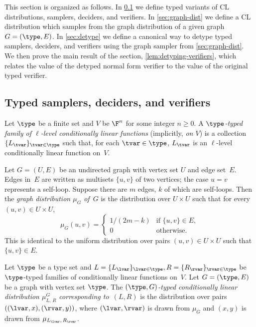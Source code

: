 This section is organized as follows.
In \cref{sec:typed-samplers} we define typed variants of CL distributions,
samplers, deciders, and verifiers.
In \cref{sec:graph-dist} we define a CL distribution which samples from the
graph distribution of a given graph $G = (\type, E)$.
In \cref{sec:detype} we define a canonical way to detype typed samplers,
deciders, and verifiers using the graph sampler from \cref{sec:graph-dist}.
We then prove the main result of the section, \cref{lem:detyping-verifiers},
which relates the value of the detyped normal form verifier to the value of
the original typed verifier.

\subsection{Typed samplers, deciders, and verifiers}
\label{sec:typed-samplers}

\begin{definition}
  Let $\type$ be a finite set and $V$ be $\F^n$ for some integer $n \geq 0$.
  A \emph{$\type$-typed family of $\ell$-level conditionally linear functions}
  (implicitly, \emph{on $V$}) is a collection $\{L_\tvar\}_{\tvar \in \type}$
  such that, for each $\tvar \in \type$, $L_\tvar$ is an $\ell$-level
  conditionally linear function on~$V$.
\end{definition}

\begin{definition}
  \label{def:graph-distribution}
  Let $G = (U, E)$ be an undirected graph with vertex set $U$ and edge set~$E$.
  Edges in~$E$ are written as multisets $\{u, v\}$ of two vertices; the case $u
  = v$ represents a self-loop.
  Suppose there are $m$ edges, $k$ of which are self-loops.
  Then the \emph{graph distribution $\mu_G$ of~$G$} is the distribution over
  $U\times U$ such that for every $(u, v)\in U\times U$,
  \begin{equation*}
    \mu_G(u, v) =
    \begin{cases}
      1/(2m-k) & \text{if $\{u, v\} \in E$},\\
      0 & \text{otherwise}.
    \end{cases}
  \end{equation*}
  This is identical to the uniform distribution over pairs $(u, v)\in U\times U$
  such that $\{u, v\} \in E$.
\end{definition}

\begin{definition}
  Let $\type$ be a type set and
  $L=\{L_\lvar\}_{\lvar\in\type},R=\{R_\rvar\}_{\rvar\in\type}$ be $\type$-typed
  families of conditionally linear functions on~$V$.
  Let $G = (\type, E)$ be a graph with vertex set $\type$.
  The \emph{$(\type, G)$-typed conditionally linear distribution $\mu_{L,\,
      R}^G$ corresponding to~$(L, R)$} is the distribution over pairs $( (\lvar,
  x), (\rvar, y) )$, where $(\lvar, \rvar)$ is drawn from $\mu_G$ and $(x,y)$ is
  drawn from $\mu_{L_\lvar,\, R_\rvar}$.
\end{definition}

